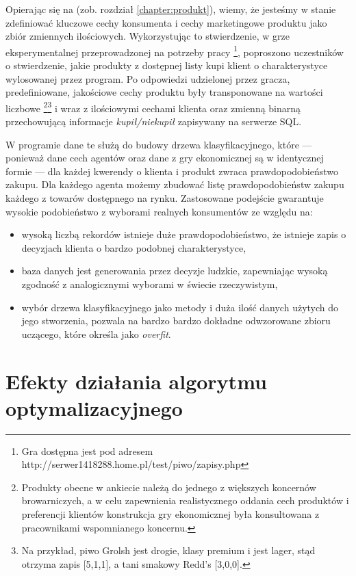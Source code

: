 \documentclass[polish, twoside, 12pt, a4paper]{article}
\theoremstyle{definition}
\theoremstyle{plain}
\theoremstyle{remark}
\begin{document}
Opierając się na \cite{Sagan2011} (zob. rozdział \ref{chapter:produkt}), wiemy, że jesteśmy w stanie zdefiniować kluczowe cechy konsumenta i cechy marketingowe produktu jako zbiór zmiennych ilościowych. Wykorzystując to stwierdzenie, w grze eksperymentalnej przeprowadzonej na potrzeby pracy \footnote{Gra dostępna jest pod adresem http://serwer1418288.home.pl/test/piwo/zapisy.php}, poproszono uczestników o stwierdzenie, jakie produkty z dostępnej listy kupi klient o charakterystyce wylosowanej przez program. Po odpowiedzi udzielonej przez gracza, predefiniowane, jakościowe cechy produktu były transponowane na wartości liczbowe \footnote{Produkty obecne w ankiecie należą do jednego z większych koncernów browarniczych, a w celu zapewnienia realistycznego oddania cech produktów i preferencji klientów konstrukcja gry ekonomicznej była konsultowana z pracownikami wspomnianego koncernu.}\footnote{Na przykład, piwo Grolsh jest drogie, klasy premium i jest lager, stąd otrzyma zapis [5,1,1], a tani smakowy Redd's [3,0,0].} i wraz z ilościowymi cechami klienta oraz zmienną binarną przechowującą informacje \textit{kupił/niekupił} zapisywany na serwerze SQL. 

W programie dane te służą do budowy drzewa klasyfikacyjnego, które --- ponieważ dane cech agentów oraz dane z gry ekonomicznej są w identycznej formie --- dla każdej kwerendy o klienta i produkt zwraca prawdopodobieństwo zakupu. Dla każdego agenta możemy zbudować listę prawdopodobieństw zakupu każdego z towarów dostępnego na rynku. Zastosowane podejście gwarantuje wysokie podobieństwo z wyborami realnych konsumentów ze względu na:

	\begin{itemize}
		\item wysoką liczbą rekordów istnieje duże prawdopodobieństwo, że istnieje zapis o decyzjach klienta o bardzo podobnej charakterystyce,
		\item baza danych jest generowania przez decyzje ludzkie, zapewniając wysoką zgodność z analogicznymi wyborami w świecie rzeczywistym,
		\item wybór drzewa klasyfikacyjnego  jako metody i duża ilość danych użytych do jego stworzenia, pozwala na bardzo bardzo dokładne odwzorowane zbioru uczącego, które \cite{James2013} określa jako \textit{overfit}. 
	\end{itemize}

\clearpage
\section{Efekty działania algorytmu optymalizacyjnego}
\end{document}
